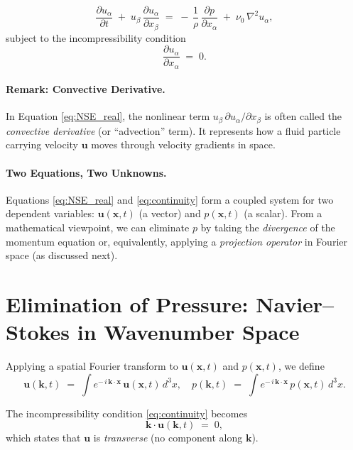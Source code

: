 \documentclass[12pt,a4paper]{article}
\newcommand\ub{\mathbf{u}}   %
\newcommand\pb{p}           %
\newcommand\x{\mathbf{x}}    %
\newcommand\kvec{\mathbf{k}} %
\begin{document}
\begin{equation}
  \frac{\partial u_{\alpha}}{\partial t} 
  \;+\; u_{\beta}\,\frac{\partial u_{\alpha}}{\partial x_{\beta}}
  \;=\;
  -\,\frac{1}{\rho}\,\frac{\partial p}{\partial x_{\alpha}}
  \;+\;\nu_{0}\,\nabla^{2}u_{\alpha},
\label{eq:NSE_real}
\end{equation}
subject to the incompressibility condition
\begin{equation}
  \frac{\partial u_{\alpha}}{\partial x_{\alpha}} \;=\; 0.
\label{eq:continuity}
\end{equation}

\paragraph{Remark: Convective Derivative.}
In Equation \eqref{eq:NSE_real}, the nonlinear term \(u_{\beta}\,\partial u_{\alpha}/\partial x_{\beta}\) is often called the \emph{convective derivative} (or “advection” term).  It represents how a fluid particle carrying velocity \(\ub\) moves through velocity gradients in space.

\paragraph{Two Equations, Two Unknowns.}
Equations \eqref{eq:NSE_real} and \eqref{eq:continuity} form a coupled system for two dependent variables: \(\ub(\x,t)\) (a vector) and \(p(\x,t)\) (a scalar).  From a mathematical viewpoint, we can eliminate \(\pb\) by taking the \emph{divergence} of the momentum equation or, equivalently, applying a \emph{projection operator} in Fourier space (as discussed next).

\section{Elimination of Pressure: Navier--Stokes in Wavenumber Space}

Applying a spatial Fourier transform to \(\ub(\x,t)\) and \(\pb(\x,t)\), we define
\begin{equation}
      \ub(\kvec,t)
  \;=\;
  \int e^{-\,i\,\kvec\cdot\x}\,\ub(\x,t)\,d^3x,
  \quad
  \pb(\kvec,t)
  \;=\;
  \int e^{-\,i\,\kvec\cdot\x}\,p(\x,t)\,d^3x.
\end{equation}


The incompressibility condition \eqref{eq:continuity} becomes
\begin{equation}
  \kvec \cdot \ub(\kvec,t)\;=\;0,
\label{eq:incompress_kspace}
\end{equation}
which states that \(\ub\) is \emph{transverse} (no component along \(\kvec\)).
\end{document}

